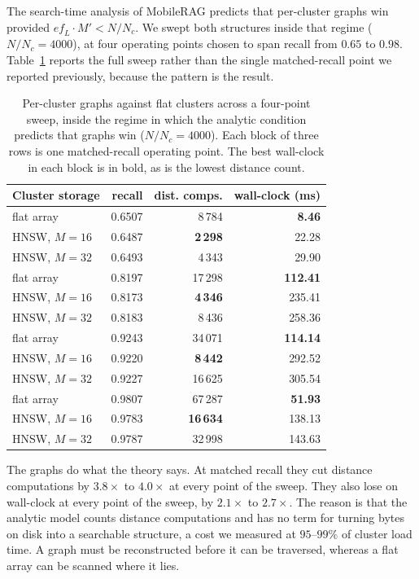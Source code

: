 \documentclass[journal]{IEEEtran}
\begin{document}
The search-time analysis of MobileRAG predicts that per-cluster graphs win
provided $\mathit{ef}_L \cdot M' < N/N_c$. We swept both structures inside
that regime ($N/N_c = 4000$), at four operating points chosen to span
recall from $0.65$ to $0.98$. Table~\ref{tab:regime} reports the full
sweep rather than the single matched-recall point we reported previously,
because the pattern is the result.

\begin{table}[!t]
\caption{Per-cluster graphs against flat clusters across a four-point
sweep, inside the regime in which the analytic condition predicts that
graphs win ($N/N_c = 4000$). Each block of three rows is one matched-recall
operating point. The best wall-clock in each block is in bold, as is the
lowest distance count.}
\label{tab:regime}
\centering
\begin{tabular}{lrrr}
\toprule
Cluster storage & recall & dist. comps. & wall-clock (ms) \\
\midrule
flat array      & 0.6507 & 8\,784  & \textbf{8.46}   \\
HNSW, $M{=}16$  & 0.6487 & \textbf{2\,298}  & 22.28  \\
HNSW, $M{=}32$  & 0.6493 & 4\,343  & 29.90  \\
\midrule
flat array      & 0.8197 & 17\,298 & \textbf{112.41} \\
HNSW, $M{=}16$  & 0.8173 & \textbf{4\,346}  & 235.41 \\
HNSW, $M{=}32$  & 0.8183 & 8\,436  & 258.36 \\
\midrule
flat array      & 0.9243 & 34\,071 & \textbf{114.14} \\
HNSW, $M{=}16$  & 0.9220 & \textbf{8\,442}  & 292.52 \\
HNSW, $M{=}32$  & 0.9227 & 16\,625 & 305.54 \\
\midrule
flat array      & 0.9807 & 67\,287 & \textbf{51.93}  \\
HNSW, $M{=}16$  & 0.9783 & \textbf{16\,634} & 138.13 \\
HNSW, $M{=}32$  & 0.9787 & 32\,998 & 143.63 \\
\bottomrule
\end{tabular}
\end{table}

The graphs do what the theory says. At matched recall they cut distance
computations by $3.8\times$ to $4.0\times$ at every point of the sweep.
They also lose on wall-clock at every point of the sweep, by $2.1\times$ to
$2.7\times$. The reason is that the analytic model counts distance
computations and has no term for turning bytes on disk into a searchable
structure, a cost we measured at $95$--$99\%$ of cluster load time. A graph
must be reconstructed before it can be traversed, whereas a flat array can
be scanned where it lies.
\end{document}
